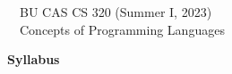 \documentclass[11pt]{article}
\begin{document}
\begin{flushright}
\begin{minipage}{430pt}
{
\begin{flushleft}
{~~\large\sc BU CAS CS 320 (Summer I, 2023)} \\
{~~\LARGE\sc Concepts of Programming Languages}
\end{flushleft}
}
\end{minipage}
\end{flushright}

\vspace{12pt}
\begin{center}
\begin{minipage}{16cm}
\begin{center}
{\LARGE\bf Syllabus} \\[12pt]
\end{center}
\end{minipage}
\end{center}

\thispagestyle{empty}
\end{document}

